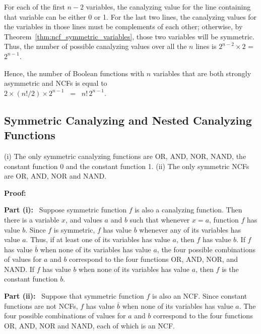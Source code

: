 For each of the first $n-2$ variables, the canalyzing value for the line
containing that variable can be either 0 or 1.  
For the last two lines, the canalyzing values for the variables 
in those lines must be complements of each other; otherwise, by 
Theorem~\ref{thm:ncf_symmetric_variables}, those two variables 
will be symmetric.
Thus, the number of possible canalyzing values over all the $n$
lines is $2^{n-2} \times 2$ = $2^{n-1}$.

Hence, the number of Boolean functions with $n$ variables that
are both strongly asymmetric and NCFs is equal to \\ 
$2 \times (n!/2) \times 2^{n-1}$ ~=~ $n!\,2^{n-1}$.  \QED


\subsection{Symmetric Canalyzing and Nested Canalyzing Functions}
\label{sse:sym_and_cf_ncf}

\begin{proposition}\label{pro:ncf_symmetric}
(i) The only symmetric canalyzing functions are OR, AND, NOR, NAND, 
the constant function 0 and the constant function 1.
(ii) The only symmetric NCFs are OR, AND, NOR and NAND.
\end{proposition}
\noindent
\textbf{Proof:}~

\smallskip

\noindent
\textbf{Part (i):}~
Suppose symmetric function $f$ is also a canalyzing function. 
Then there is a variable $x$, and values $a$ and $b$ 
such that whenever $x = a$, function $f$ has value $b$.  
Since $f$ is symmetric, $f$  has
value $b$ whenever any of its variables has value $a$.  
Thus, if at least one of its variables has value $a$, then $f$ has value $b$.  
If $f$ has value $\overline{b}$ when none of its variables has
value $a$, the four possible combinations of values for $a$ and $b$
correspond to the four functions OR, AND, NOR, and NAND.  If $f$
has value $b$ when none of its variables has value $a$, then $f$
is the constant function $b$.

\smallskip

\noindent
\textbf{Part (ii):}~
Suppose that symmetric function $f$ is also an NCF.  
Since constant functions are not NCFs,
$f$ has value $\overline{b}$ when none of its variables has value $a$.
The four possible combinations of values for $a$ and $b$ correspond
to the four functions OR, AND, NOR and NAND, each of which is an
NCF.  \QED








